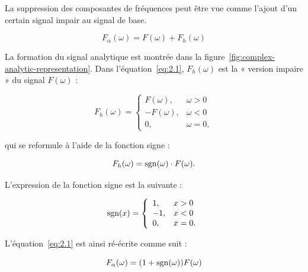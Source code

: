 La suppression des composantes de fréquences peut être vue comme l'ajout d'un certain signal impair au signal de base.

\begin{equation} \label{eq:2.1}
    F_{\alpha}(\omega) = F(\omega) + F_h(\omega)
\end{equation}

La formation du signal analytique est montrée dans la figure~\ref{fig:complex-analytic-representation}. Dans l'équation~\ref{eq:2.1}, $F_h(\omega)$ est la « version impaire » du signal $F(\omega)$ :

\begin{equation}
    F_h(\omega) = \left\{
    \begin{array}{ll}
        F(\omega), & \omega > 0 \\
        -F(\omega), & \omega < 0 \\
        0, & \omega = 0,
    \end{array}
    \right.
\end{equation}

qui se reformule à l'aide de la fonction signe :

\begin{equation}
    F_h(\omega) = \operatorname{sgn}(\omega)\cdot F(\omega).
    \label{eq:2.5}
\end{equation}

L'expression de la fonction signe est la suivante :

\begin{equation}
    \operatorname{sgn}(x) = \left\{
    \begin{array}{ll}
        1, & x > 0 \\
        -1, & x < 0 \\
        0, & x = 0.
    \end{array}
    \right.
\end{equation}

L'équation~\ref{eq:2.1} est ainsi ré-écrite comme suit :

\begin{equation}
    F_{\alpha}(\omega) = (1+\operatorname{sgn}(\omega))F(\omega)
\end{equation}

